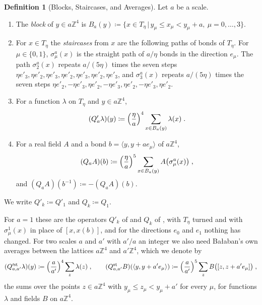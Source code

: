 \documentclass[11pt]{preprint}
\numberwithin{equation}{section}
\theoremstyle{definition}
\newtheorem{definition}[theorem]{Definition}
\theoremstyle{remark}
\theoremstyle{plain}
\begin{document}
\begin{definition}[Blocks, Staircases, and Averages]\label{def:averages}
Let $a$ be a scale.
\begin{enumerate}[label=(\roman*)]
\item The \emph{block} of $y \in a\mathbb Z^4$ is $B_a(y) \coloneqq \{ x \in T_\eta \, | \, y_\mu \leq x_\mu < y_\mu + a,\ \mu = 0, \dots, 3 \}$.
\item For $x \in T_\eta$ the \emph{staircases} from $x$ are the following paths of bonds of $T_\eta$. For $\mu \in \{ 0, 1 \}$, $\sigma^a_\mu(x)$ is the straight path of $a/\eta$ bonds in the direction $e_\mu$. The path $\sigma^a_2(x)$ repeats $a/(5\eta)$ times the seven steps $\eta e'_3, \eta e'_2, \eta e'_3, \eta e'_2, \eta e'_3, \eta e'_2, \eta e'_3$, and $\sigma^a_3(x)$ repeats $a/(5\eta)$ times the seven steps $\eta e'_2, -\eta e'_3, \eta e'_2, -\eta e'_3, \eta e'_2, -\eta e'_3, \eta e'_2$.
\item For a function $\lambda$ on $T_\eta$ and $y \in a\mathbb Z^4$,
\begin{equation}\label{eq:scalar-average}
    (Q'_a\lambda)(y) \coloneqq \Bigl(\frac{\eta}{a}\Bigr)^4\sum_{x \in B_a(y)}\lambda(x)\;.
\end{equation}
\item For a real field $A$ and a bond $b = \langle y, y + ae_\mu\rangle$ of $a\mathbb Z^4$,
\begin{equation}\label{eq:vector-average}
    (Q_aA)(b) \coloneqq \Bigl(\frac{\eta}{a}\Bigr)^5\sum_{x \in B_a(y)}A\bigl(\sigma^a_\mu(x)\bigr)\;,
\end{equation}
and $(Q_aA)(b^{-1}) \coloneqq -(Q_aA)(b)$.
\end{enumerate}
We write $Q'_k \coloneqq Q'_1$ and $Q_k \coloneqq Q_1$.
\end{definition}

For $a = 1$ these are the operators $Q'_k$ of \cite[p.~20]{BalabanPRT1} and $Q_k$ of \cite[(1.18), p.~20]{BalabanPRT1}, with $T_\eta$ turned and with $\sigma^1_\mu(x)$ in place of $[x, x(b)]$, and for the directions $e_0$ and $e_1$ nothing has changed. For two scales $a$ and $a'$ with $a'/a$ an integer we also need Ba{\l}aban's own averages between the lattices $a\mathbb Z^4$ and $a'\mathbb Z^4$, which we denote by
\begin{equation}\label{eq:standard-averages}
    (Q'^{\mathrm{st}}_{a,a'}\lambda)(y) \coloneqq \Bigl(\frac{a}{a'}\Bigr)^4\sum_{z}\lambda(z)\;,
    \qquad
    (Q^{\mathrm{st}}_{a,a'}B)(\langle y, y + a'e_\mu\rangle) \coloneqq \Bigl(\frac{a}{a'}\Bigr)^5\sum_{z}B\bigl([z, z + a'e_\mu]\bigr)\;,
\end{equation}
the sums over the points $z \in a\mathbb Z^4$ with $y_\mu \leq z_\mu < y_\mu + a'$ for every $\mu$, for functions $\lambda$ and fields $B$ on $a\mathbb Z^4$.
\end{document}
